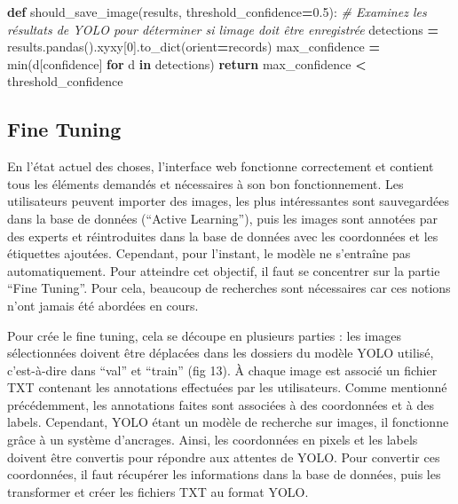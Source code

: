 \documentclass[
  10pt,
]{article}
\newenvironment{Shaded}{\begin{snugshade}}{\end{snugshade}}
\newcommand{\BuiltInTok}[1]{#1}
\newcommand{\CommentTok}[1]{\textcolor[rgb]{0.56,0.35,0.01}{\textit{#1}}}
\newcommand{\ControlFlowTok}[1]{\textcolor[rgb]{0.13,0.29,0.53}{\textbf{#1}}}
\newcommand{\DecValTok}[1]{\textcolor[rgb]{0.00,0.00,0.81}{#1}}
\newcommand{\FloatTok}[1]{\textcolor[rgb]{0.00,0.00,0.81}{#1}}
\newcommand{\KeywordTok}[1]{\textcolor[rgb]{0.13,0.29,0.53}{\textbf{#1}}}
\newcommand{\NormalTok}[1]{#1}
\newcommand{\OperatorTok}[1]{\textcolor[rgb]{0.81,0.36,0.00}{\textbf{#1}}}
\newcommand{\StringTok}[1]{\textcolor[rgb]{0.31,0.60,0.02}{#1}}
\begin{document}
\begin{Shaded}
\begin{Highlighting}[]
\KeywordTok{def}\NormalTok{ should\_save\_image(results, threshold\_confidence}\OperatorTok{=}\FloatTok{0.5}\NormalTok{):}
    \CommentTok{\# Examinez les résultats de YOLO pour déterminer si l\textquotesingle{}image doit être enregistrée}
\NormalTok{    detections }\OperatorTok{=}\NormalTok{ results.pandas().xyxy[}\DecValTok{0}\NormalTok{].to\_dict(orient}\OperatorTok{=}\StringTok{\textquotesingle{}records\textquotesingle{}}\NormalTok{)}
\NormalTok{    max\_confidence }\OperatorTok{=} \BuiltInTok{min}\NormalTok{(d[}\StringTok{\textquotesingle{}confidence\textquotesingle{}}\NormalTok{] }\ControlFlowTok{for}\NormalTok{ d }\KeywordTok{in}\NormalTok{ detections)}
    \ControlFlowTok{return}\NormalTok{ max\_confidence }\OperatorTok{\textless{}}\NormalTok{ threshold\_confidence}
\end{Highlighting}
\end{Shaded}

\subsection{Fine Tuning}\label{fine-tuning}

En l'état actuel des choses, l'interface web fonctionne correctement et
contient tous les éléments demandés et nécessaires à son bon
fonctionnement. Les utilisateurs peuvent importer des images, les plus
intéressantes sont sauvegardées dans la base de données (``Active
Learning''), puis les images sont annotées par des experts et
réintroduites dans la base de données avec les coordonnées et les
étiquettes ajoutées. Cependant, pour l'instant, le modèle ne s'entraîne
pas automatiquement. Pour atteindre cet objectif, il faut se concentrer
sur la partie ``Fine Tuning''. Pour cela, beaucoup de recherches sont
nécessaires car ces notions n'ont jamais été abordées en cours.

Pour crée le fine tuning, cela se découpe en plusieurs parties : les
images sélectionnées doivent être déplacées dans les dossiers du modèle
YOLO utilisé, c'est-à-dire dans ``val'' et ``train'' (fig 13). À chaque
image est associé un fichier TXT contenant les annotations effectuées
par les utilisateurs. Comme mentionné précédemment, les annotations
faites sont associées à des coordonnées et à des labels. Cependant, YOLO
étant un modèle de recherche sur images, il fonctionne grâce à un
système d'ancrages. Ainsi, les coordonnées en pixels et les labels
doivent être convertis pour répondre aux attentes de YOLO. Pour
convertir ces coordonnées, il faut récupérer les informations dans la
base de données, puis les transformer et créer les fichiers TXT au
format YOLO.
\end{document}
